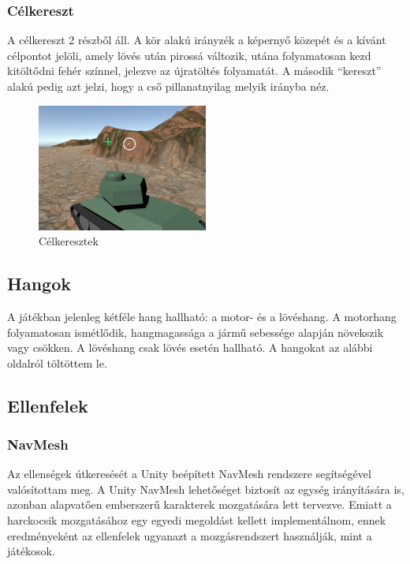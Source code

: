 \documentclass[
]{thesis-ekf}
\theoremstyle{definition}
\theoremstyle{remark}
\begin{document}
\subsubsection{Célkereszt}

A célkereszt 2 részből áll. A kör alakú irányzék a képernyő közepét és a kívánt célpontot jelöli, amely lövés után pirossá változik, utána folyamatosan kezd kitöltődni fehér színnel, jelezve az újratöltés folyamatát. A második ``kereszt'' alakú pedig azt jelzi, hogy a cső pillanatnyilag melyik irányba néz.

\begin{figure}[H]
    \centering
    \includegraphics[width=0.5\textwidth]{screenshots/crosshair.png}
    \caption{Célkeresztek}
    \label{fig:crosshair}
\end{figure}

\subsection{Hangok}

A játékban jelenleg kétféle hang hallható: a motor- és a lövéshang. A motorhang folyamatosan ismétlődik, hangmagassága a jármű sebessége alapján növekszik vagy csökken. A lövéshang csak lövés esetén hallható. A hangokat az alábbi oldalról\cite{freesound} töltöttem le.

\subsection{Ellenfelek}

\subsubsection{NavMesh}

Az ellenségek útkeresését a Unity beépített NavMesh rendszere segítségével valósítottam meg. A Unity NavMesh lehetőséget biztosít az egység irányítására is, azonban alapvatően emberszerű karakterek mozgatására lett tervezve. Emiatt a harckocsik mozgatásához egy egyedi megoldást kellett implementálnom, ennek eredményeként az ellenfelek ugyanazt a mozgásrendszert használják, mint a játékosok.
\end{document}
